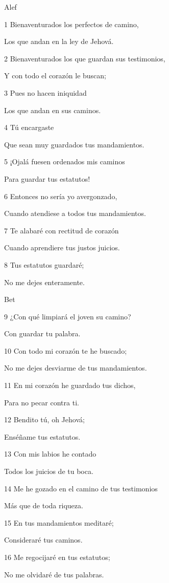 \par Alef

\par 1 Bienaventurados los perfectos de camino,
\par Los que andan en la ley de Jehová.
\par 2 Bienaventurados los que guardan sus testimonios,
\par Y con todo el corazón le buscan;
\par 3 Pues no hacen iniquidad
\par Los que andan en sus caminos.
\par 4 Tú encargaste
\par Que sean muy guardados tus mandamientos.
\par 5 ¡Ojalá fuesen ordenados mis caminos
\par Para guardar tus estatutos!
\par 6 Entonces no sería yo avergonzado,
\par Cuando atendiese a todos tus mandamientos.
\par 7 Te alabaré con rectitud de corazón
\par Cuando aprendiere tus justos juicios.
\par 8 Tus estatutos guardaré;
\par No me dejes enteramente.
\par Bet
\par 9 ¿Con qué limpiará el joven su camino?
\par Con guardar tu palabra.
\par 10 Con todo mi corazón te he buscado;
\par No me dejes desviarme de tus mandamientos.
\par 11 En mi corazón he guardado tus dichos,
\par Para no pecar contra ti.
\par 12 Bendito tú, oh Jehová;
\par Enséñame tus estatutos.
\par 13 Con mis labios he contado
\par Todos los juicios de tu boca.
\par 14 Me he gozado en el camino de tus testimonios
\par Más que de toda riqueza.
\par 15 En tus mandamientos meditaré;
\par Consideraré tus caminos.
\par 16 Me regocijaré en tus estatutos;
\par No me olvidaré de tus palabras.

